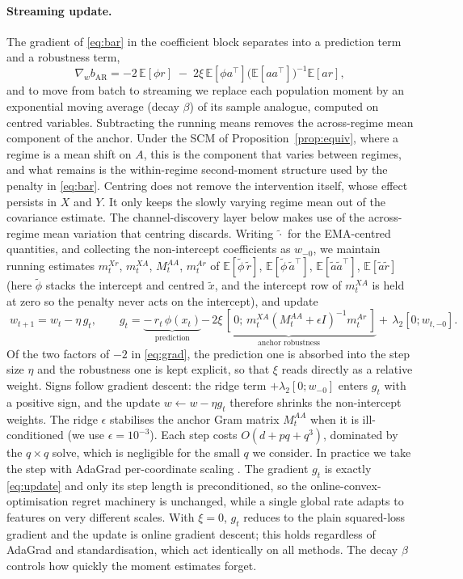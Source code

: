 \documentclass[11pt]{article}
\theoremstyle{plain}
\theoremstyle{remark}
\newcommand{\E}{\mathbb{E}}
\begin{document}
\paragraph{Streaming update.}
The gradient of \eqref{eq:bar} in the coefficient block separates into a prediction
term and a robustness term,
\begin{equation}\label{eq:grad}
\nabla_w b_{\mathrm{AR}} = -2\,\E[\phi r]
 \;-\;2\xi\,\E[\phi a^\top]\big(\E[aa^\top]\big)^{-1}\E[a r],
\end{equation}
and to move from batch to streaming we replace each population moment by an exponential
moving average (decay $\beta$) of its sample analogue, computed on centred variables.
Subtracting the running means removes the across-regime mean component of the anchor.
Under the SCM of Proposition~\ref{prop:equiv}, where a regime is a mean shift on $A$,
this is the component that varies between regimes, and what remains is the
within-regime second-moment structure used by the penalty in \eqref{eq:bar}.
Centring does not remove the intervention itself, whose effect persists in $X$ and
$Y$. It only keeps the slowly varying regime mean out of the covariance estimate. The
channel-discovery layer below makes use of the across-regime mean variation that
centring discards. Writing $\tilde\cdot$ for the EMA-centred quantities, and
collecting the non-intercept coefficients as $w_{-0}$, we maintain running estimates
$m^{Xr}_t$, $m^{XA}_t$, $M^{AA}_t$, $m^{Ar}_t$ of
$\E[\tilde\phi\,\tilde r]$, $\E[\tilde\phi\,\tilde a^\top]$,
$\E[\tilde a\tilde a^\top]$, $\E[\tilde a\tilde r]$ (here $\tilde\phi$ stacks the
intercept and centred $\tilde x$, and the intercept row of $m^{XA}_t$ is held at
zero so the penalty never acts on the intercept), and update
\begin{equation}\label{eq:update}
\boxed{\;w_{t+1}=w_t-\eta\,g_t,\qquad
 g_t=\underbrace{-\,r_t\,\phi(x_t)}_{\text{prediction}}
 \underbrace{-\,2\xi\,[\,0;\,m^{XA}_t(M^{AA}_t+\epsilon I)^{-1}m^{Ar}_t\,]}_{\text{anchor robustness}}
 +\,\lambda_2[0;w_{t,-0}].\;}
\end{equation}
Of the two factors of $-2$ in \eqref{eq:grad}, the prediction one is absorbed into
the step size $\eta$ and the robustness one is kept explicit, so that $\xi$ reads
directly as a relative weight. Signs follow gradient descent: the ridge term
$+\lambda_2[0;w_{-0}]$ enters $g_t$ with a positive sign, and the update
$w\!\leftarrow\!w-\eta g_t$ therefore shrinks the non-intercept weights. The ridge
$\epsilon$ stabilises the anchor Gram matrix $M^{AA}_t$ when it is ill-conditioned (we
use $\epsilon=10^{-3}$). Each step costs $O(d+pq+q^3)$, dominated by the $q\times q$
solve, which is negligible for the small $q$ we consider. In practice we take the step
with AdaGrad per-coordinate scaling \citep{duchi2011adagrad}. The gradient $g_t$ is
exactly \eqref{eq:update} and only its step length is preconditioned, so the
online-convex-optimisation regret machinery is unchanged, while a single global rate
adapts to features on very different scales. With $\xi=0$, $g_t$ reduces to the plain
squared-loss gradient and the update is online gradient descent; this holds
regardless of AdaGrad and standardisation, which act identically on all methods. The
decay $\beta$ controls how quickly the moment estimates forget.
\end{document}
